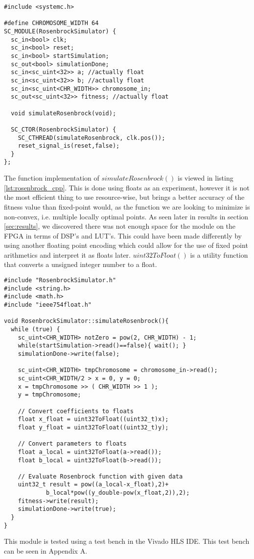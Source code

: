 \begin{lstlisting}[style=customc++,caption={RosenbrockSimulator.h},label={lst:rosenbrock_h}]
#include <systemc.h>

#define CHROMOSOME_WIDTH 64
SC_MODULE(RosenbrockSimulator) {
  sc_in<bool> clk;
  sc_in<bool> reset;
  sc_in<bool> startSimulation;
  sc_out<bool> simulationDone;
  sc_in<sc_uint<32>> a; //actually float
  sc_in<sc_uint<32>> b; //actually float
  sc_in<sc_uint<CHR_WIDTH>> chromosome_in;
  sc_out<sc_uint<32>> fitness; //actually float

  void simulateRosenbrock(void);

  SC_CTOR(RosenbrockSimulator) {
    SC_CTHREAD(simulateRosenbrock, clk.pos());
    reset_signal_is(reset,false);
  }
};
\end{lstlisting}

The function implementation of $simulateRosenbrock()$ is viewed in listing \ref{lst:rosenbrock_cpp}. This is done using floats as an experiment, however it is not the most efficient thing to use resource-wise, but brings a better accuracy of the fitness value than fixed-point would, as the function we are looking to minimize is non-convex, i.e. multiple locally optimal points. As seen later in results in section \ref{sec:results}, we discovered there was not enough space for the module on the FPGA in terms of DSP's and LUT's. This could have been made differently by using another floating point encoding which could allow for the use of fixed point arithmetics and interpret it as floats later. $uint32ToFloat()$ is a utility function that converts a unsigned integer number to a float.

\begin{lstlisting}[style=customc++,caption={RosenbrockSimulator.cpp},label={lst:rosenbrock_cpp}]
#include "RosenbrockSimulator.h"
#include <string.h>
#include <math.h>
#include "ieee754float.h"

void RosenbrockSimulator::simulateRosenbrock(){
  while (true) {
    sc_uint<CHR_WIDTH> notZero = pow(2, CHR_WIDTH) - 1;
    while(startSimulation->read()==false){ wait(); }
    simulationDone->write(false);
    
    sc_uint<CHR_WIDTH> tmpChromosome = chromosome_in->read();
    sc_uint<CHR_WIDTH/2 > x = 0, y = 0;
    x = tmpChromosome >> ( CHR_WIDTH >> 1 );
    y = tmpChromosome;
    
    // Convert coefficients to floats
    float x_float = uint32ToFloat((uint32_t)x);
   	float y_float = uint32ToFloat((uint32_t)y);
   	
   	// Convert parameters to floats
   	float a_local = uint32ToFloat(a->read());
   	float b_local = uint32ToFloat(b->read());
   
   	// Evaluate Rosenbrock function with given data
    uint32_t result = pow((a_local-x_float),2)+
    		b_local*pow((y_double-pow(x_float,2)),2);
    fitness->write(result);
    simulationDone->write(true);
  }
}
\end{lstlisting}

This module is tested using a test bench in the Vivado HLS IDE. This test bench can be seen in Appendix A.
